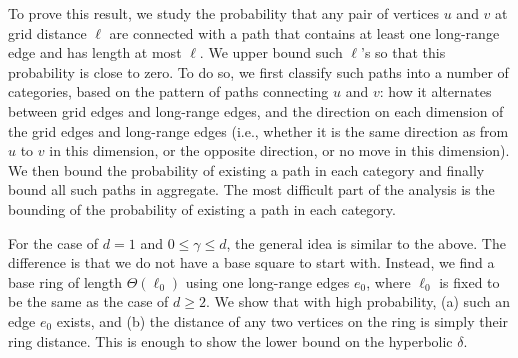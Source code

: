 \documentclass[11pt]{article}
\begin{document}
To prove this result, we study the probability that any pair of
	vertices $u$ and $v$ at grid distance $\ell$ 
	are connected with a path that contains at least one long-range
	edge and has length 
	at most $\ell$.
We upper bound such $\ell$'s 
	so that this probability is close to zero.
To do so, we first classify such paths into a number of categories, based 
	on the pattern of paths connecting $u$ and $v$: how it alternates
	between grid edges and long-range edges, and the direction on each
	dimension of the grid edges and long-range edges (i.e., whether it is
	the same direction as from $u$ to $v$ in this dimension, or the opposite
	direction, or no move in this dimension).
We then bound the probability of existing a path in each category and finally 
	bound all such paths in aggregate.
The most difficult part of the analysis is the bounding of the probability
	of existing a path in each category.

For the case of $d = 1$ and $0 \le \gamma \le d$, the general idea is similar
	to the above.
The difference is that we do not have a base square to start with.
Instead, we find a base ring of length $\Theta(\ell_0)$ using one
	long-range edges $e_0$, where $\ell_0$ is fixed to be the same
	as the case of $d\ge 2$.
We show that with high probability, 
	(a) such an edge $e_0$ exists, and
	(b) the distance of any two vertices on the ring is simply their ring 
	distance.
This is enough to show the lower bound on the hyperbolic $\delta$.


\end{document}
